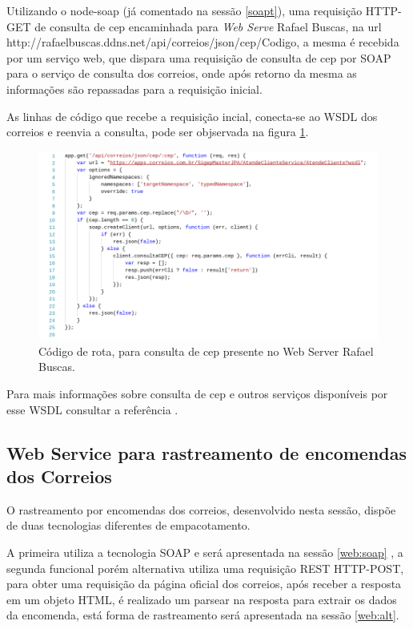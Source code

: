 \documentclass[12pt]{article}
\begin{document}
Utilizando o node-soap (já comentado na sessão \ref{soapt}), uma requisição HTTP-GET de consulta de cep encaminhada para \textit{Web Serve} Rafael Buscas, na url http://rafaelbuscas.ddns.net/api/correios/json/cep/Codigo, a mesma é recebida por um serviço web, que dispara uma requisição de consulta de cep por SOAP para o serviço de consulta dos correios, onde após retorno da mesma as informações são repassadas para a requisição inicial.

As linhas de código que recebe a requisição incial, conecta-se ao WSDL dos correios e reenvia a consulta, pode ser objservada na figura \ref{c22}. 
	
\begin{figure}[H]
	\centering
	\includegraphics[scale=0.48]{Imagens/codigocep.png}
	\caption{Código de rota, para consulta de cep presente no Web Server Rafael Buscas.}
	\label{c22}
\end{figure}

Para mais informações sobre consulta de cep e outros serviços disponíveis por esse WSDL consultar a referência \cite{correiosapp}.

\subsection{Web Service para rastreamento de encomendas dos Correios}
	O rastreamento por encomendas dos correios, desenvolvido nesta sessão, dispõe de duas tecnologias diferentes de empacotamento.
	
	A primeira utiliza a tecnologia SOAP e será apresentada na sessão \ref{web:soap} , a segunda funcional porém alternativa utiliza uma requisição REST HTTP-POST, para obter uma requisição da página oficial dos correios, após receber a resposta em um objeto HTML, é realizado um parsear na resposta para extrair os dados da encomenda, está forma de rastreamento será apresentada na sessão \ref{web:alt}.
\end{document}
